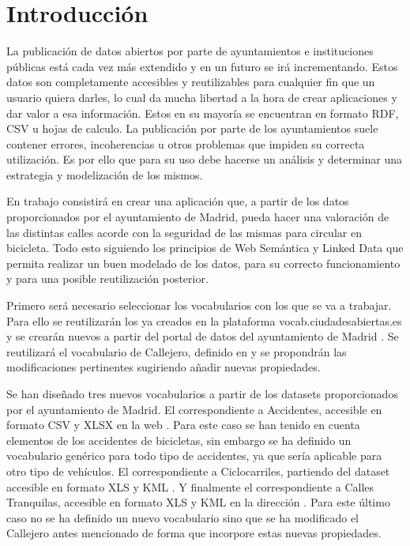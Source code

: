 \chapter{Introducción}

La publicación de datos abiertos por parte de ayuntamientos e instituciones públicas está cada vez más extendido y en un futuro se irá incrementando. Estos datos son completamente accesibles y reutilizables para cualquier fin que un usuario quiera darles, lo cual da mucha libertad a la hora de crear aplicaciones y dar valor a esa información.
Estos en su mayoría se encuentran en formato RDF, CSV u hojas de calculo. La publicación por parte de los ayuntamientos suele contener errores, incoherencias u otros problemas que impiden su correcta utilización. Es por ello que para su uso debe hacerse un análisis y determinar una estrategia y modelización de los mismos.


En trabajo consistirá en crear una aplicación que, a partir de los datos proporcionados por el ayuntamiento de Madrid, pueda hacer una valoración de las distintas calles acorde con la seguridad de las mismas para circular en bicicleta. Todo esto siguiendo los principios de Web Semántica y Linked Data que permita realizar un buen modelado de los datos, para su correcto funcionamiento y para una posible reutilización posterior.


Primero será necesario seleccionar los vocabularios con los que se va a trabajar. Para ello se reutilizarán los ya creados en la plataforma vocab.ciudadesabiertas.es \cite{ciudadesabiertas_catalogoVocabs} y se crearán nuevos a partir del portal de datos del ayuntamiento de Madrid \cite{datosabiertos_ayuntmadrid}. Se reutilizará el vocabulario de Callejero, definido en \cite{ciudadesbiertas_callejero} y se propondrán las modificaciones pertinentes sugiriendo añadir nuevas propiedades.

Se han diseñado tres nuevos vocabularios a partir de los datasets proporcionados por el ayuntamiento de Madrid. El correspondiente a Accidentes, accesible en formato CSV y XLSX en la web \cite{datosMadrid_accidentesDeBicicleta}. Para este caso se han tenido en cuenta elementos de los accidentes de bicicletas, sin embargo se ha definido un vocabulario genérico para todo tipo de accidentes, ya que sería aplicable para otro tipo de vehículos. El correspondiente a Ciclocarriles, partiendo del dataset accesible en formato XLS y KML \cite{datosMadrid_ciclocarriles}. Y finalmente el correspondiente a Calles Tranquilas, accesible en formato XLS y KML en la dirección \cite{datosMadrid_callesTranquilas}. Para este último caso no se ha definido un nuevo vocabulario sino que se ha modificado el Callejero antes mencionado de forma que incorpore estas nuevas propiedades.


